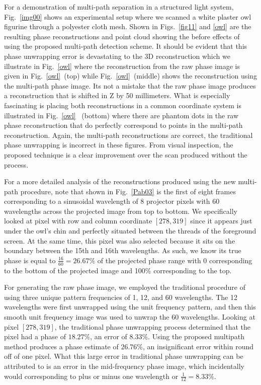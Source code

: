 \documentclass[10pt]{article}
\begin{document}
For a demonstration of multi-path separation in a structured light system, Fig.~\ref{img00} shows an experimental setup where we scanned a white plaster owl figurine through a polyester cloth mesh. Shown in Figs.~\ref{fig11} and \ref{owl} are the resulting phase reconstructions and point cloud showing the before effects of using the proposed multi-path detection scheme. It should be evident that this phase unwrapping error is devastating to the 3D reconstruction which we illustrate in Fig.~\ref{owl} where the reconstruction from the raw phase image is given in Fig.~\ref{owl}~(top) while Fig.~\ref{owl}~(middle) shows the reconstruction using the multi-path phase image.  Its not a mistake that the raw phase image produces a reconstruction that is shifted in Z by 50 millimeters. What is especially fascinating is placing both reconstructions in a common coordinate system is illustrated in Fig.~\ref{owl} ~(bottom) where there are phantom dots in the raw phase reconstruction that do perfectly correspond to points in the multi-path reconstruction.  Again, the multi-path reconstructions are correct, the traditional phase unwrapping is incorrect in these figures. From visual inspection, the proposed technique is a clear improvement over the scan produced without the process.




For a more detailed analysis of the reconstructions produced using the new multi-path procedure, note that shown in Fig.~\ref{Pab03} is the first of eight frames corresponding to a sinusoidal wavelength of 8 projector pixels with 60 wavelengths across the projected image from top to bottom. We specifically looked at pixel with row and column coordinate $[278,319]$ since it appears just under the owl's chin and perfectly situated between the threads of the foreground screen. At the same time, this pixel was also selected because it sits on the boundary between the 15th and 16th wavelengths.  As such, we know its true phase is equal to $\frac{16}{60} = 26.67\%$ of the projected phase range with 0 corresponding to the bottom of the projected image and 100\% corresponding to the top.




For generating the raw phase image, we employed the traditional procedure of using three unique pattern frequencies of 1, 12, and 60 wavelengths.  The 12 wavelengths were first unwrapped using the unit frequency pattern, and then this smooth unit frequency image was used to unwrap the 60 wavelengths.  Looking at pixel $[278,319]$, the traditional phase unwrapping process determined that the pixel had a phase of $18.27\%$, an error of $8.33\%$. Using the proposed multipath method produces a phase estimate of $26.76\%$, an insignificant error within round off of one pixel.  What this large error in traditional phase unwrapping can be attributed to is an error in the mid-frequency phase image, which incidentally would corresponding to plus or minus one wavelength or $\frac{1}{12}=8.33\%$.
\end{document}
